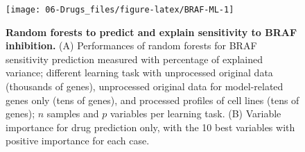 \documentclass[a4paper,12pt,twoside,onecolumn,openright,final,oldfontcommands]{memoir}
\begin{document}
\begin{figure}

{\centering \texttt{[image: 06-Drugs\_files/figure-latex/BRAF-ML-1]} 

}

\caption[Random forests to predict and explain sensitivity to BRAF inhibition]{\textbf{Random forests to predict and explain
sensitivity to BRAF inhibition.} (A) Performances of random forests for
BRAF sensitivity prediction measured with percentage of explained
variance; different learning task with unprocessed original data
(thousands of genes), unprocessed original data for model-related genes
only (tens of genes), and processed profiles of cell lines (tens of
genes); \(n\) samples and \(p\) variables per learning task. (B)
Variable importance for drug prediction only, with the 10 best variables
with positive importance for each case.}\label{fig:BRAF-ML}
\end{figure}
\end{document}
